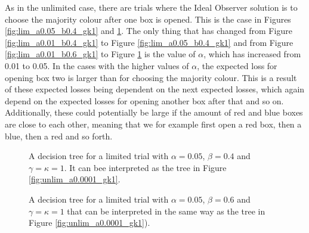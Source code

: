 As in the unlimited case, there are trials where the Ideal Observer solution is to choose the majority colour after one box is opened. This is the case in Figures \ref{fig:lim_a0.05_b0.4_gk1} and \ref{fig:lim_a0.05_b0.6_gk1}. The only thing that has changed from Figure \ref{fig:lim_a0.01_b0.4_gk1} to Figure \ref{fig:lim_a0.05_b0.4_gk1} and from Figure \ref{fig:lim_a0.01_b0.6_gk1} to Figure \ref{fig:lim_a0.05_b0.6_gk1} is the value of $\alpha$, which has increased from 0.01 to 0.05. In the cases with the higher values of $\alpha$, the expected loss for opening box two is larger than for choosing the majority colour. This is a result of these expected losses being dependent on the next expected losses, which again depend on the expected losses for opening another box after that and so on. Additionally, these could potentially be large if the amount of red and blue boxes are close to each other, meaning that we for example first open a red box, then a blue, then a red and so forth. 

\begin{figure}
    \centering
    \begin{minipage}[t]{0.45\textwidth} 
        \centering
        \scalebox{0.8}{}
        \caption[IO solution limited. $\alpha=0.05$, $\beta=0.4$ and $\gamma=\kappa=1$.]{A decision tree for a limited trial with $\alpha = 0.05$, $\beta=0.4$ and $\gamma=\kappa=1$. It can bee interpreted as the tree in Figure \ref{fig:unlim_a0.0001_gk1}.}
        \label{fig:lim_a0.05_b0.4_gk1}
    \end{minipage}\hfill
    \begin{minipage}[t]{0.45\textwidth} 
        \centering
        \scalebox{0.8}{}
        \caption[IO solution limited. $\alpha=0.05$, $\beta=0.6$ and $\gamma=\kappa=1$.]{A decision tree for a limited trial with $\alpha = 0.05$, $\beta=0.6$ and $\gamma=\kappa=1$ that can be interpreted in the same way as the tree in Figure \ref{fig:unlim_a0.0001_gk1}).}
        \label{fig:lim_a0.05_b0.6_gk1}
    \end{minipage}
\end{figure}

